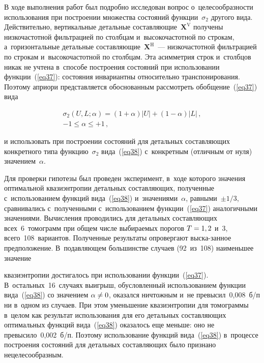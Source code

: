 \begin{multicols}{2}
В ходе выполнения работ был подробно исследован вопрос о~целесообразности 
использования при построении множества со\-сто\-яний функции~$\sigma_2$ другого вида. 
Действительно, вертикальные детальные со\-став\-ля\-ющие~$\mathbf{X}^{\mathrm{V}}$ 
получены низкочастотной фильтрацией по столбцам и~высокочастотной по строкам, 
а~горизонтальные детальные со\-став\-ля\-ющие~$\mathbf{X}^{\mathrm{H}}$~--- 
низкочастотной фильтрацией по строкам и~высокочастотной по столбцам. Эта асим\-мет\-рия 
строк и~столбцов никак не учтена в~способе построения состояний при использовании 
функции~(\ref{eq37}): состояния инвариантны относительно транспонирования. 
Поэтому априори представляется обоснованным рассмотреть обобщение~(\ref{eq37}) \mbox{вида}

\vspace*{-3pt}

\noindent
\begin{multline}
\label{eq38}
\sigma_2(U,L;\alpha) = (1+\alpha)|U| + (1-\alpha)|L|\,,\\
-1\leq\alpha\leq +1\,,
\end{multline}

\vspace*{-1pt}

\noindent
и использовать при построении состояний для детальных составляющих конкретного 
типа функцию~$\sigma_2$  вида~(\ref{eq38}) с~конкретным (отличным от нуля) 
значением~$\alpha$.

Для проверки гипотезы был проведен эксперимент, в~ходе которого 
значения оптимальной квазиэнтропии детальных составляющих, полученные с~использованием
 функций вида~(\ref{eq38}) и~значениями~$\alpha$, равными~$\pm1/3$, 
 сравнивались с~полученными с~использованием функции~(\ref{eq37}) аналогичными 
 значениями. Вычисления проводились для детальных составляющих всех~6~томограмм 
 при общем числе выбираемых порогов  $T\hm=1,2$ и~3, всего~108~вариантов. 
 Полученные результаты опровергают выска-\linebreak занное предположение. 
 В~подавляющем большинстве случаев (92~из~108) 
 наименьшее значение\linebreak\vspace*{-12pt}
 
 \columnbreak
 
 \noindent
 квазиэнтропии достигалось при использовании функции~(\ref{eq37}). 
 В~остальных~16~случаях выигрыш, обусловленный использованием функции вида~(\ref{eq38}) 
 со значением $\alpha\hm\neq 0$, оказался ничтожным и~не превысил~0,008~б/п 
 ни в~одном из случаев. При этом уменьшение квазиэнтропии для томограммы в~целом 
 как результат использования для его детальных составляющих оптимальных функций 
 вида~(\ref{eq38}) оказалось еще меньше: оно не превысило~0,002~б/п. 
 Поэтому использование функций вида~(\ref{eq38}) в~процессе построения 
 со\-сто\-яний для детальных со\-став\-ля\-ющих было признано нецелесообразным.


\end{multicols}
